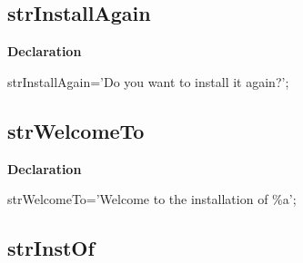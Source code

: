 \documentclass{report}
\newif\ifpdf
\begin{document}
\subsection*{strInstallAgain}
\fi
\label{trstrings-strInstallAgain}
\begin{list}{}{
\setlength{\itemindent}{0cm}
\setlength{\listparindent}{0cm}
\setlength{\leftmargin}{\evensidemargin}
\addtolength{\leftmargin}{\tmplength}
\settowidth{\labelsep}{X}
\addtolength{\leftmargin}{\labelsep}
\setlength{\labelwidth}{\tmplength}
}
\item[\textbf{Declaration}\hfill]
\ifpdf
\begin{flushleft}
\fi
\begin{ttfamily}
strInstallAgain='Do you want to install it again?';\end{ttfamily}

\ifpdf
\end{flushleft}
\fi

\end{list}
\ifpdf
\subsection*{\large{\textbf{strWelcomeTo}}\normalsize\hspace{1ex}\hrulefill}
\else
\subsection*{strWelcomeTo}
\fi
\label{trstrings-strWelcomeTo}
\begin{list}{}{
\setlength{\itemindent}{0cm}
\setlength{\listparindent}{0cm}
\setlength{\leftmargin}{\evensidemargin}
\addtolength{\leftmargin}{\tmplength}
\settowidth{\labelsep}{X}
\addtolength{\leftmargin}{\labelsep}
\setlength{\labelwidth}{\tmplength}
}
\item[\textbf{Declaration}\hfill]
\ifpdf
\begin{flushleft}
\fi
\begin{ttfamily}
strWelcomeTo='Welcome to the installation of {\%}a';\end{ttfamily}

\ifpdf
\end{flushleft}
\fi

\end{list}
\ifpdf
\subsection*{\large{\textbf{strInstOf}}\normalsize\hspace{1ex}\hrulefill}
\else
\end{document}

